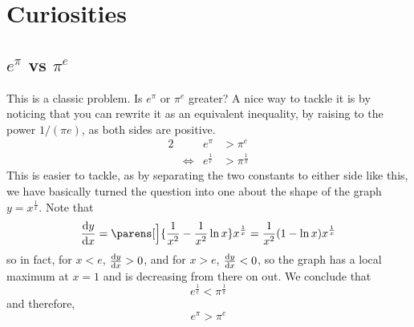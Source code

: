 \section{Curiosities}

\subsection[\texorpdfstring{\(e^\pi\) vs \(\pi^e\)}{e to the pi vs pi to the e}]
           {\boldmath\(e^\pi\) vs \(\pi^e\)}

This is a classic problem. Is \(e^\pi\) or \(\pi^e\) greater? A nice way to
tackle it is by noticing that you can rewrite it as an equivalent inequality, by
raising to the power \(1 / (\pi e)\), as both sides are positive.
\begin{alignat*}2
 && e^\pi &> \pi^e \\
 &\iff{}& e^{\frac 1e} &> \pi^{\frac 1\pi}
\end{alignat*}
This is easier to tackle, as by separating the two constants to either side like
this, we have basically turned the question into one about the shape of the
graph \(y = x^{\frac 1x}\). Note that
\begin{equation*}
 \dv<y>{x} = \parens[\Big]{\frac 1{x^2} - \frac 1{x^2}\ln x} x^{\frac 1x}
           = \frac 1{x^2} (1 - \ln x) x^{\frac 1x}
\end{equation*}
so in fact, for \(x < e\), \(\dv<y>{x} > 0\), and for
\(x > e\), \(\dv<y>{x} < 0\), so the graph has a local maximum at \(x = 1\) and
is decreasing from there on out. We conclude that
\begin{equation*}
 e^{\frac 1e} < \pi^{\frac 1\pi}
\end{equation*}
and therefore,
\begin{equation*}
 e^\pi > \pi^e
\end{equation*}
